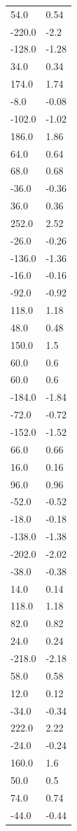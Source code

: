 \begin{longtable}{ll}
54.0 & 0.54 \\
-220.0 & -2.2 \\
-128.0 & -1.28 \\
34.0 & 0.34 \\
174.0 & 1.74 \\
-8.0 & -0.08 \\
-102.0 & -1.02 \\
186.0 & 1.86 \\
64.0 & 0.64 \\
68.0 & 0.68 \\
-36.0 & -0.36 \\
36.0 & 0.36 \\
252.0 & 2.52 \\
-26.0 & -0.26 \\
-136.0 & -1.36 \\
-16.0 & -0.16 \\
-92.0 & -0.92 \\
118.0 & 1.18 \\
48.0 & 0.48 \\
150.0 & 1.5 \\
60.0 & 0.6 \\
60.0 & 0.6 \\
-184.0 & -1.84 \\
-72.0 & -0.72 \\
-152.0 & -1.52 \\
66.0 & 0.66 \\
16.0 & 0.16 \\
96.0 & 0.96 \\
-52.0 & -0.52 \\
-18.0 & -0.18 \\
-138.0 & -1.38 \\
-202.0 & -2.02 \\
-38.0 & -0.38 \\
14.0 & 0.14 \\
118.0 & 1.18 \\
82.0 & 0.82 \\
24.0 & 0.24 \\
-218.0 & -2.18 \\
58.0 & 0.58 \\
12.0 & 0.12 \\
-34.0 & -0.34 \\
222.0 & 2.22 \\
-24.0 & -0.24 \\
160.0 & 1.6 \\
50.0 & 0.5 \\
74.0 & 0.74 \\
-44.0 & -0.44 \\

\end{longtable}
